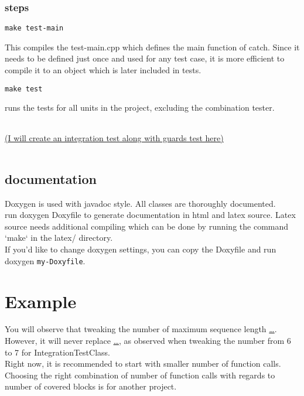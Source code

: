 \documentclass{elteikthesis}[2018/06/06]
\begin{document}
\subsubsection{steps}
\label{sec-3-2-3-1}
\begin{verbatim}
make test-main
\end{verbatim}
This compiles the test-main.cpp which defines the main function of catch. Since it needs to be defined just once and used for any test case, it is more efficient to compile it to an object which is later included in tests. \\
\begin{verbatim}
make test
\end{verbatim}
runs the tests for all units in the project, excluding the combination tester. \\
\begin{center}
\begin{tabular}{}
\\
\\
\end{tabular}
\end{center}
\uline{(I will create an integration test along with guards test here)}  \\
\begin{center}
\begin{tabular}{}
\\
\\
\end{tabular}
\end{center}
\subsection{documentation}
\label{sec-3-2-4}
Doxygen is used with javadoc style. All classes are thoroughly documented. \\
run doxygen Doxyfile to generate documentation in html and latex source. Latex source needs additional compiling which can be done by running the command `make` in the latex/ directory. \\
If you'd like to change doxygen settings, you can copy the Doxyfile and run doxygen \texttt{my-Doxyfile}. \\
\section{Example}
\label{sec-3-3}

You will observe that tweaking the number of maximum sequence length \uline{\ldots{}}. However, it will never replace \uline{\ldots{}}, as observed when tweaking the number from 6 to 7 for IntegrationTestClass. \\
Right now, it is recommended to start with smaller number of function calls. \\
Choosing the right combination of number of function calls with regards to number of covered blocks is for another project. \\
\end{document}
